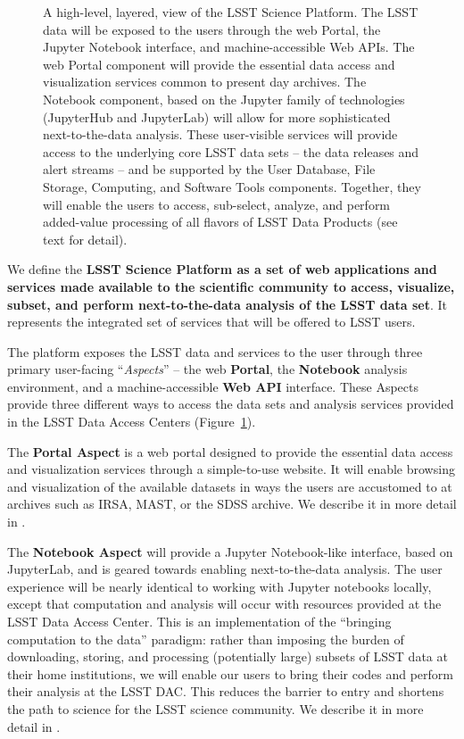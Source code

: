 \begin{figure}
\centering
{}
\caption{
A high-level, layered, view of the LSST Science Platform.  The LSST data
will be exposed to the users through the web Portal, the Jupyter Notebook
interface, and machine-accessible Web APIs.  The web Portal component will
provide the essential data access and visualization services common to
present day archives.  The Notebook component, based on the Jupyter family
of technologies (JupyterHub and JupyterLab) will allow for more
sophisticated next-to-the-data analysis.  These user-visible services will
provide access to the underlying core LSST data sets -- the data releases and
alert streams -- and be supported by the User Database, File Storage,
Computing, and Software Tools components.  Together, they will enable the
users to access, sub-select, analyze, and perform added-value processing of
all flavors of LSST Data Products (see text for detail).
\label{fig:layeredLSP}}
\end{figure}

We define the \textbf{LSST Science Platform as a set of web applications and services
made available to the scientific community to access, visualize, subset, and
perform next-to-the-data analysis of the LSST data set}. It represents the integrated
set of services that will be offered to LSST users.

The platform exposes the LSST data
and services to the user through three primary user-facing ``\textit{Aspects}'' -- the web \textbf{Portal},
the \textbf{Notebook} analysis environment, and a machine-accessible \textbf{Web API} interface.
These Aspects provide three different ways to access the data sets and analysis services provided in the LSST Data Access Centers (Figure~\ref{fig:layeredLSP}).

The \textbf{Portal Aspect} is a web portal designed to provide the essential data
access and visualization services through a simple-to-use website.  It will
enable browsing and visualization of the available datasets in ways the
users are accustomed to at archives such as IRSA, MAST, or the SDSS archive.
We describe it in more detail in .

The \textbf{Notebook Aspect} will provide a Jupyter Notebook-like interface,
based on JupyterLab, and is geared towards enabling next-to-the-data analysis.
The user experience will
be nearly identical to working with Jupyter notebooks locally, except that computation
and analysis will occur with resources provided at the LSST Data Access Center.
This is an
implementation of the ``bringing computation to the data'' paradigm: rather
than imposing the burden of downloading, storing, and processing (potentially large)
subsets of LSST data at their home institutions, we will enable our users to
bring their codes and perform their analysis at the LSST DAC.
This reduces the barrier to entry and shortens the path to science for
the LSST science community. We describe it in more detail in .

